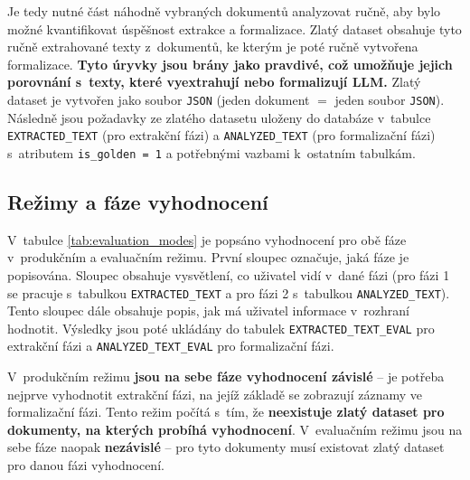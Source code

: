 \documentclass[czech, bc, kiv, he, iso690numb, pdf]{fasthesis}
\begin{document}
Je tedy nutné část náhodně vybraných dokumentů analyzovat ručně, aby bylo možné kvantifikovat úspěšnost extrakce a formalizace. Zlatý dataset obsahuje tyto ručně extrahované texty z~dokumentů, ke kterým je poté ručně vytvořena formalizace. \textbf{Tyto úryvky jsou brány jako pravdivé, což umožňuje jejich porovnání s~texty, které vyextrahují nebo formalizují LLM.} Zlatý dataset je vytvořen jako soubor \verb"JSON" (jeden dokument $=$ jeden soubor \verb"JSON"). Následně jsou požadavky ze zlatého datasetu uloženy do databáze v~tabulce \verb"EXTRACTED_TEXT" (pro extrakční fázi) a \verb"ANALYZED_TEXT" (pro formalizační fázi) s~atributem \verb"is_golden = 1" a potřebnými vazbami k~ostatním tabulkám. 

\subsection{Režimy a fáze vyhodnocení}
V~tabulce \ref{tab:evaluation_modes} je popsáno vyhodnocení pro obě fáze v~produkčním a evaluačním režimu. První sloupec  označuje, jaká fáze je popisována. Sloupec  obsahuje vysvětlení, co uživatel vidí v~dané fázi (pro fázi 1 se pracuje s~tabulkou \verb"EXTRACTED_TEXT" a pro fázi 2 s~tabulkou \verb"ANALYZED_TEXT"). Tento sloupec dále obsahuje popis, jak má uživatel informace v~rozhraní hodnotit. Výsledky jsou poté ukládány do tabulek \verb"EXTRACTED_TEXT_EVAL" pro extrakční fázi a \verb"ANALYZED_TEXT_EVAL" pro formalizační fázi.

V~produkčním režimu \textbf{jsou na sebe fáze vyhodnocení závislé} -- je potřeba nejprve vyhodnotit extrakční fázi, na jejíž základě se zobrazují záznamy ve formalizační fázi. Tento režim počítá s~tím, že \textbf{neexistuje zlatý dataset pro dokumenty, na kterých probíhá vyhodnocení}. V~evaluačním režimu jsou na sebe fáze naopak \textbf{nezávislé} -- pro tyto dokumenty musí existovat zlatý dataset pro danou fázi vyhodnocení.
 
\end{document}
